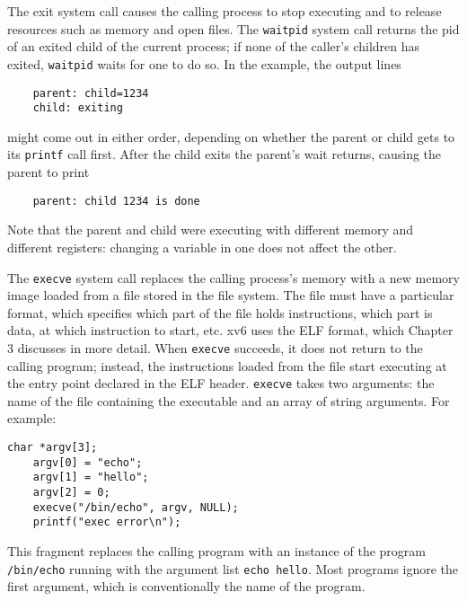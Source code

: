 \documentclass{report}
\begin{document}
	The exit system call causes the calling process to stop executing and to release
	resources such as memory and open files. The \texttt{waitpid} system call returns the pid of an
	exited child of the current process; if none of the caller's children has exited, \texttt{waitpid}
	waits for one to do so. In the example, the output lines
	\begin{lstlisting}
	parent: child=1234
	child: exiting
	\end{lstlisting}
	might come out in either order, depending on whether the parent or child gets to its
	\texttt{printf} call first. After the child exits the parent's wait returns, causing the parent to
	print
	\begin{lstlisting}
	parent: child 1234 is done
	\end{lstlisting}
	Note that the parent and child were executing with different memory and different
	registers: changing a variable in one does not affect the other.
	
	The \texttt{execve} system call replaces the calling process's memory with a new memory
	image loaded from a file stored in the file system. The file must have a particular format, 
	which specifies which part of the file holds instructions, which part is data, at
	which instruction to start, etc. xv6 uses the ELF format, which Chapter 3 discusses in
	more detail. When \texttt{execve} succeeds, it does not return to the calling program; instead,
	the instructions loaded from the file start executing at the entry point declared in the
	ELF header. \texttt{execve} takes two arguments: the name of the file containing the executable
	and an array of string arguments. For example:
	
	\begin{lstlisting}[style=c]
	char *argv[3];
	argv[0] = "echo";
	argv[1] = "hello";
	argv[2] = 0;
	execve("/bin/echo", argv, NULL);
	printf("exec error\n");
	\end{lstlisting}
	
	This fragment replaces the calling program with an instance of the program
	\texttt{/bin/echo} running with the argument list \texttt{echo hello}. Most 
	programs ignore the first argument, which is conventionally the name of the program.
	
\end{document}

